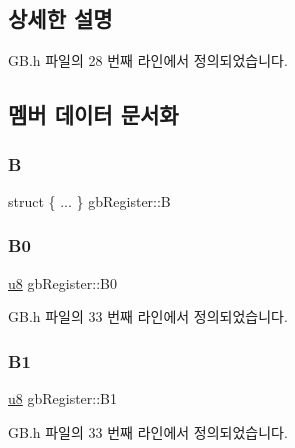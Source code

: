 \subsection{상세한 설명}


G\+B.\+h 파일의 28 번째 라인에서 정의되었습니다.



\subsection{멤버 데이터 문서화}
\mbox{\label{uniongb_register_a038dba01c9bc9f3d72a2d49094319cb5}} 
\subsubsection{\texorpdfstring{B}{B}}
{\footnotesize\ttfamily struct \{ ... \}   gb\+Register\+::B}

\mbox{\label{uniongb_register_a33d5b51c075ca4181cc1e72211f3a131}} 
\subsubsection{\texorpdfstring{B0}{B0}}
{\footnotesize\ttfamily \mbox{\hyperlink{_system_8h_aed742c436da53c1080638ce6ef7d13de}{u8}} gb\+Register\+::\+B0}



G\+B.\+h 파일의 33 번째 라인에서 정의되었습니다.

\mbox{\label{uniongb_register_afcb77cfe78f40d8fd1eccfa75f679867}} 
\subsubsection{\texorpdfstring{B1}{B1}}
{\footnotesize\ttfamily \mbox{\hyperlink{_system_8h_aed742c436da53c1080638ce6ef7d13de}{u8}} gb\+Register\+::\+B1}



G\+B.\+h 파일의 33 번째 라인에서 정의되었습니다.

\mbox{\label{uniongb_register_ab3d596e48605bc14793ff0292e6ed814}} 
